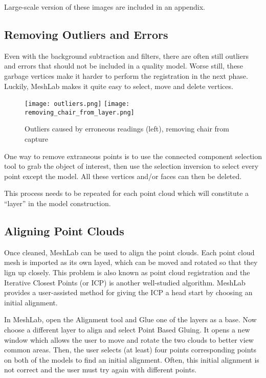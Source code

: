 Large-scale version of these images are included in an appendix.
\subsection{Removing Outliers and Errors}

Even with the background subtraction and filters, there are often still
outliers and errors that should not be included in a quality model. Worse still,
these garbage vertices make it harder to perform the registration in the next phase.
Luckily, MeshLab \cite{cignoni2008meshlab} makes it quite easy to select,
move and delete vertices.

\begin{figure}[h]
\centering
\texttt{[image: outliers.png]}
\texttt{[image: removing\_chair\_from\_layer.png]}
\caption{Outliers caused by erroneous readings (left), removing chair from capture}
\end{figure}

One way to remove extraneous points is to use the connected component selection
tool to grab the object of interest, then use the selection inversion to select
every point except the model. All these vertices and/or faces can then be deleted.

This process needs to be repeated for each point cloud which will constitute
a ``layer'' in the model construction.

\subsection{Aligning Point Clouds}

Once cleaned, MeshLab \cite{cignoni2008meshlab} can be used to align the point clouds.
Each point cloud mesh is imported as its own layed, which can be moved and rotated so that
they lign up closely. This problem is also known as point cloud registration \cite{pomerleau2015review} and the Iterative
Closest Points (or ICP) is another well-studied algorithm. MeshLab provides a user-assisted
method for giving the ICP a head start by choosing an initial alignment.

In MeshLab, open the Alignment tool and Glue one of the layers as a base.
Now choose a different layer to align and select Point Based Gluing.
It opens a new window which allows the user to move and rotate the two clouds to better view
common areas. Then, the user selects (at least) four points corresponding points on
both of the models to find an initial alignment.
Often, this initial alignment is not correct and the user must try again
with different points.

